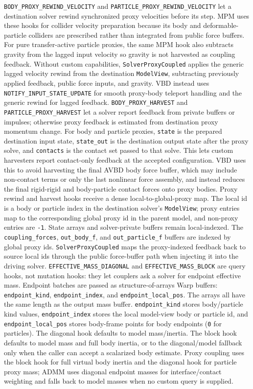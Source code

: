 \documentclass[11pt]{article}
\begin{document}
\texttt{BODY\_PROXY\_REWIND\_VELOCITY} and
\texttt{PARTICLE\_PROXY\_REWIND\_VELOCITY} let a destination solver rewind
synchronized proxy velocities before its step. MPM uses these hooks for collider
velocity preparation because its body and deformable-particle colliders are
prescribed rather than integrated from public force buffers. For pure
transfer-active particle proxies, the same MPM hook also subtracts gravity from
the lagged input velocity so gravity is not harvested as coupling feedback.
Without custom capabilities, \texttt{SolverProxyCoupled} applies the generic
lagged velocity rewind from the destination \texttt{ModelView}, subtracting
previously applied feedback, public force inputs, and gravity.
VBD instead uses \texttt{NOTIFY\_INPUT\_STATE\_UPDATE} for smooth proxy-body
teleport handling and the generic rewind for lagged feedback.
\texttt{BODY\_PROXY\_HARVEST} and \texttt{PARTICLE\_PROXY\_HARVEST} let a solver
report feedback from private buffers or impulses; otherwise proxy feedback is
estimated from destination proxy momentum change.
For body and particle proxies, \texttt{state} is the prepared destination input
state, \texttt{state\_out} is the destination output state after the proxy solve,
and \texttt{contacts} is the contact set passed to that solve. This lets custom
harvesters report contact-only feedback at the accepted configuration. VBD uses
this to avoid harvesting the final AVBD body force buffer, which may include
non-contact terms or only the last nonlinear force assembly, and instead reduces
the final rigid-rigid and body-particle contact forces onto proxy bodies.
Proxy rewind and harvest hooks receive a dense local-to-global-proxy map.
The local id is a body or particle index in the destination solver's
\texttt{ModelView}; proxy entries map to the corresponding global proxy id in
the parent model, and non-proxy entries are \texttt{-1}.  State arrays and
solver-private buffers remain local-indexed.  The \texttt{coupling\_forces},
\texttt{out\_body\_f}, and \texttt{out\_particle\_f} buffers are indexed by
global proxy ids.
\texttt{SolverProxyCoupled} maps the proxy-indexed feedback back to source
local ids through the public force-buffer path when injecting it into the
driving solver.
\texttt{EFFECTIVE\_MASS\_DIAGONAL} and \texttt{EFFECTIVE\_MASS\_BLOCK} are
query hooks, not mutation hooks: they let couplers ask a solver for endpoint
effective mass. Endpoint batches are passed as structure-of-arrays Warp
buffers: \texttt{endpoint\_kind}, \texttt{endpoint\_index}, and
\texttt{endpoint\_local\_pos}. The arrays all have the same length as the
output mass buffer. \texttt{endpoint\_kind} stores body/particle kind values,
\texttt{endpoint\_index} stores the local model-view body or particle id, and
\texttt{endpoint\_local\_pos} stores body-frame points for body endpoints
(\texttt{0} for particles). The diagonal hook defaults to model mass/inertia.
The block hook defaults to model mass and full body inertia, or to the
diagonal/model fallback only when the caller can accept a scalarized body
estimate. Proxy coupling uses the block hook for full virtual body inertia and
the diagonal hook for particle proxy mass; ADMM uses diagonal endpoint masses
for interface/contact weighting and falls back to model masses when no custom
query is supplied.
\end{document}
